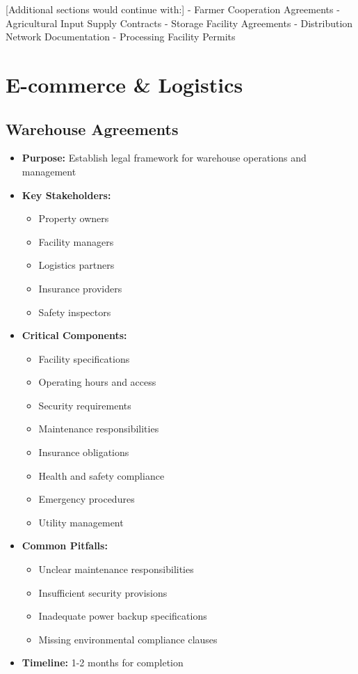 [Additional sections would continue with:]
- Farmer Cooperation Agreements
- Agricultural Input Supply Contracts
- Storage Facility Agreements
- Distribution Network Documentation
- Processing Facility Permits

\section{E-commerce \& Logistics}

\subsection{Warehouse Agreements}
\begin{tcolorbox}[colback=white,colframe=primarydark,title=\textbf{Warehouse Documentation}]
\begin{itemize}
    \item \textbf{Purpose:} Establish legal framework for warehouse operations and management
    \item \textbf{Key Stakeholders:}
    \begin{itemize}
        \item Property owners
        \item Facility managers
        \item Logistics partners
        \item Insurance providers
        \item Safety inspectors
    \end{itemize}
    \item \textbf{Critical Components:}
    \begin{itemize}
        \item Facility specifications
        \item Operating hours and access
        \item Security requirements
        \item Maintenance responsibilities
        \item Insurance obligations
        \item Health and safety compliance
        \item Emergency procedures
        \item Utility management
    \end{itemize}
    \item \textbf{Common Pitfalls:}
    \begin{itemize}
        \item Unclear maintenance responsibilities
        \item Insufficient security provisions
        \item Inadequate power backup specifications
        \item Missing environmental compliance clauses
    \end{itemize}
    \item \textbf{Timeline:} 1-2 months for completion
\end{itemize}


\end{tcolorbox}
